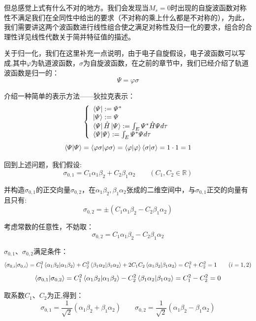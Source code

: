 但总感觉上式有什么不对的地方。我们会发现当$M_s=0$时出现的自旋波函数对称性不满足我们在全同性中给出的要求（不对称的乘上什么都是不对称的），为此，我们需要讲这两个波函数进行线性组合使之满足对称性及归一化的要求，组合的合理性详见线性代数关于简并特征值的描述。

关于归一化，我们在这里补充一点说明，由于电子自旋假设，电子波函数可以写成,其中$\varphi$为轨道波函数，$\sigma$为自旋波函数，在之前的章节中，我们已经介绍了轨道波函数是归一的：
\[\varPsi=\varphi\sigma\]

介绍一种简单的表示方法——狄拉克表示：
\[
    \left \{
    \begin{array}{l}
        \bra{\varPsi}:=\varPsi^{*} \\
        \ket{\varPsi}:=\varPsi \\
        \bra{\varPsi}\hat{H}\ket{\varPsi}:=\int_E \varPsi^{*}\hat{H}\varPsi d\tau \\
        \bra{\varPsi}\ket{\varPsi}:=\int_E \varPsi^{*}\varPsi d\tau 
    \end{array} 
    \right .
\]
\[\bra{\varPsi}\ket{\varPsi}=\bra{\varphi\sigma}\ket{\varphi\sigma}=\bra{\varphi}\ket{\varphi}\bra{\sigma}\ket{\sigma}=1 \cdot 1=1\]

回到上述问题，我们假设:
\[\sigma_{0,1}=C_1\alpha_1\beta_2+C_2\beta_1\alpha_2 \qquad (C_1,C_2 \in \mathbb{R})\]

并构造$\sigma_{0,1}$的正交向量$\sigma_{0,2}$，在$\alpha_1\beta_2,\beta_1\alpha_2$张成的二维空间中，与$\sigma_{0,1}$正交的向量有且只有:
\[\sigma_{0,2}= \pm (C_1\alpha_1\beta_2-C_2\beta_1\alpha_2)\]

考虑常数的任意性，不妨取：
\[\sigma_{0,2}= C_1\alpha_1\beta_2-C_2\beta_1\alpha_2\]

$\sigma_{0,1}$、$\sigma_{0,2}$满足条件：
\[\bra{\sigma_{0,i}}\ket{\sigma_{0,i}}=C_1^2\bra{\alpha_1\beta_2}\ket{\alpha_1\beta_2}+C_2^2\bra{\beta_1\alpha_2}\ket{\beta_1\alpha_2}+2C_1C_2\bra{\alpha_1\beta_2}\ket{\beta_1\alpha_2}=C_1^2+C_2^2=1 \qquad (i=1,2)\]
\[\bra{\sigma_{0,1}}\ket{\sigma_{0,2}}=C_1^2\bra{\alpha_1\beta_2}\ket{\alpha_1\beta_2}-C_2^2\bra{\beta_1\alpha_2}\ket{\beta_1\alpha_2}=C_1^2-C_2^2=0\]

取系数$C_1$、$C_2$为正,得到：
\[\sigma_{0,1}=\frac{1}{\sqrt{2}}(\alpha_1\beta_2+\beta_1\alpha_2) \qquad \sigma_{0,2}= \frac{1}{\sqrt{2}}(\alpha_1\beta_2-\beta_1\alpha_2)\]

